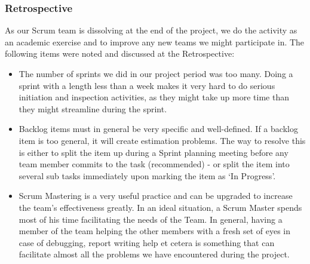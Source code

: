 \subsubsection{Retrospective}
As our Scrum team is dissolving at the end of the project, we do the activity as an academic exercise and to improve any new teams we might participate in. The following items were noted and discussed at the Retrospective:
\begin{itemize}
\item The number of sprints we did in our project period was too many. Doing a sprint with a length less than a week makes it very hard to do serious initiation and inspection activities, as they might take up more time than they might streamline during the sprint.
\item Backlog items must in general be very specific and well-defined. If a backlog item is too general, it will create estimation problems. The way to resolve this is either to split the item up during a Sprint planning meeting before any team member commits to the task (recommended) - or split the item into several sub tasks immediately upon marking the item as `In Progress'.
\item Scrum Mastering is a very useful practice and can be upgraded to increase the team's effectiveness greatly. In an ideal situation, a Scrum Master spends most of his time facilitating the needs of the Team. In general, having a member of the team helping the other members with a fresh set of eyes in case of debugging, report writing help et cetera is something that can facilitate almost all the problems we have encountered during the project.
\end{itemize}
\newpage